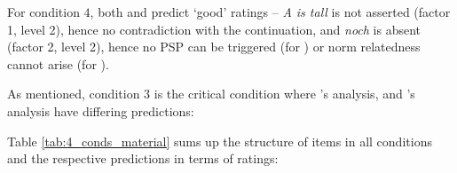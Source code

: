\documentclass[output=paper,
modfonts
]{langscibook}
\begin{document}
For condition $4$, both \citeauthor{Hofstetter2013} and \citeauthor{umbach2009a_comp} predict `good' ratings -- \textit{A is tall} is not asserted (factor 1, level 2), hence no contradiction with the continuation, and \textit{noch} is absent (factor 2, level 2), hence no PSP can be triggered (for \citeauthor{Hofstetter2013}) or norm relatedness cannot arise (for \citeauthor{umbach2009a_comp}).

As mentioned, condition 3 is the critical condition where \citeauthor{Hofstetter2013}'s \citeyearpar{Hofstetter2013} analysis, and \citeauthor{umbach2009a_comp}'s \citeyearpar{umbach2009a_comp} analysis have differing predictions:

Table \ref{tab:4_conds_material} sums up the structure of items in all conditions and the respective predictions in terms of ratings:
\end{document}
